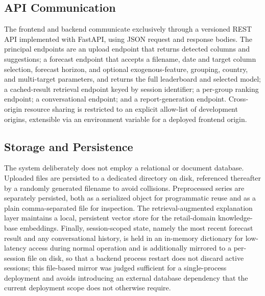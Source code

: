 \subsection{API Communication}
The frontend and backend communicate exclusively through a versioned REST API implemented with FastAPI, using JSON request and response bodies. The principal endpoints are an upload endpoint that returns detected columns and suggestions; a forecast endpoint that accepts a filename, date and target column selection, forecast horizon, and optional exogenous-feature, grouping, country, and multi-target parameters, and returns the full leaderboard and selected model; a cached-result retrieval endpoint keyed by session identifier; a per-group ranking endpoint; a conversational endpoint; and a report-generation endpoint. Cross-origin resource sharing is restricted to an explicit allow-list of development origins, extensible via an environment variable for a deployed frontend origin.

\subsection{Storage and Persistence}
The system deliberately does not employ a relational or document database. Uploaded files are persisted to a dedicated directory on disk, referenced thereafter by a randomly generated filename to avoid collisions. Preprocessed series are separately persisted, both as a serialized object for programmatic reuse and as a plain comma-separated file for inspection. The retrieval-augmented explanation layer maintains a local, persistent vector store for the retail-domain knowledge-base embeddings. Finally, session-scoped state, namely the most recent forecast result and any conversational history, is held in an in-memory dictionary for low-latency access during normal operation and is additionally mirrored to a per-session file on disk, so that a backend process restart does not discard active sessions; this file-based mirror was judged sufficient for a single-process deployment and avoids introducing an external database dependency that the current deployment scope does not otherwise require.
